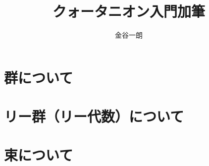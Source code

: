 \documentclass[twocolunmn]{jsarticle}
\title{クォータニオン入門加筆}
\author{金谷一朗}
\begin{document}
\setlength{\baselineskip}{17pt}
\maketitle

\section{群について}

\section{リー群（リー代数）について}

\section{束について}
\end{document}
